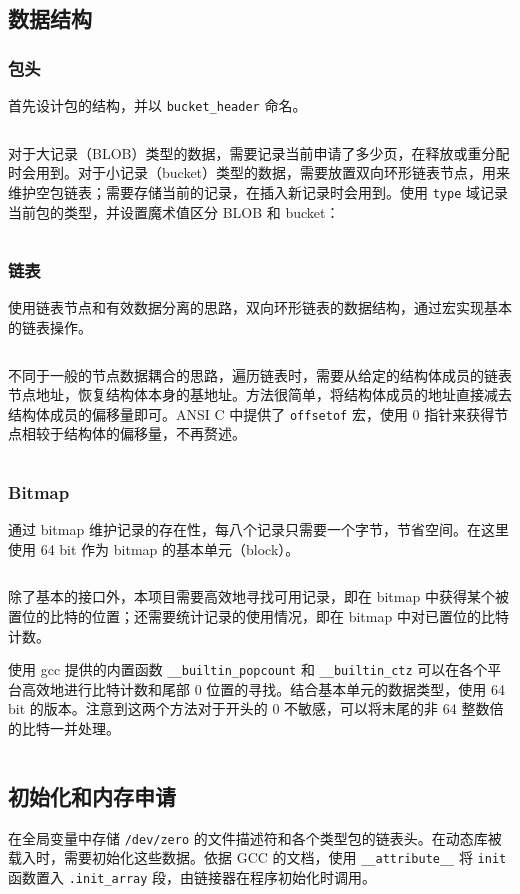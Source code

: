 \documentclass[12pt, a4paper]{article}
\newcommand{\LabSrc}[1]{\inputminted[fontsize=\scriptsize, breaklines]{c}{./src/#1.c}}
\begin{document}
\subsection{数据结构}

\subsubsection{包头}
首先设计包的结构，并以 \texttt{bucket\_header} 命名。

\LabSrc{bag}

对于大记录（BLOB）类型的数据，需要记录当前申请了多少页，在释放或重分配时会用到。对于小记录（bucket）类型的数据，需要放置双向环形链表节点，用来维护空包链表；需要存储当前的记录，在插入新记录时会用到。使用 \texttt{type} 域记录当前包的类型，并设置魔术值区分 BLOB 和 bucket：

\LabSrc{bag_def}

\subsubsection{链表}
使用链表节点和有效数据分离的思路，双向环形链表的数据结构，通过宏实现基本的链表操作。

\LabSrc{list}

不同于一般的节点数据耦合的思路，遍历链表时，需要从给定的结构体成员的链表节点地址，恢复结构体本身的基地址。方法很简单，将结构体成员的地址直接减去结构体成员的偏移量即可。ANSI C 中提供了 \texttt{offsetof} 宏，使用 0 指针来获得节点相较于结构体的偏移量，不再赘述。

\LabSrc{list_em}

\subsubsection{Bitmap}
通过 bitmap 维护记录的存在性，每八个记录只需要一个字节，节省空间。在这里使用 64 bit 作为 bitmap 的基本单元（block）。

\LabSrc{bitmap}

除了基本的接口外，本项目需要高效地寻找可用记录，即在 bitmap 中获得某个被置位的比特的位置；还需要统计记录的使用情况，即在 bitmap 中对已置位的比特计数。

使用 gcc 提供的内置函数 \texttt{\_\_builtin\_popcount} 和 \texttt{\_\_builtin\_ctz} 可以在各个平台高效地进行比特计数和尾部 0 位置的寻找。结合基本单元的数据类型，使用 64 bit 的版本。注意到这两个方法对于开头的 0 不敏感，可以将末尾的非 64 整数倍的比特一并处理。

\LabSrc{bitmap_em}

\subsection{初始化和内存申请}
在全局变量中存储 \texttt{/dev/zero} 的文件描述符和各个类型包的链表头。在动态库被载入时，需要初始化这些数据。依据 GCC 的文档，使用 \texttt{\_\_attribute\_\_} 将 \texttt{init} 函数置入 \texttt{.init\_array} 段，由链接器在程序初始化时调用。
\end{document}
